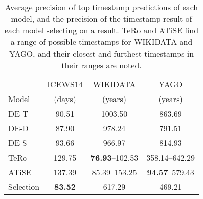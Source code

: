 \begin{table}[htb]
\centering
\begin{minipage}{0.95\columnwidth}
\centering
\caption{Average precision of top timestamp predictions of each model, and the precision of the timestamp result of each model selecting on a result. TeRo and ATiSE find a range of possible timestamps for WIKIDATA and YAGO, and their closest and furthest timestamps in their ranges are noted.}
\vspace{-3mm}

\begin{tabular}{l|ccc}\hline
 & ICEWS14 & WIKIDATA & YAGO \\
Model & (days) & (years) & (years) \\ \hline
DE-T & 90.51 & 1003.50 & 863.69 \\ 
DE-D & 87.90 & 978.24 & 791.51 \\ 
DE-S & 93.66 & 966.97 & 814.93 \\ 
TeRo & 129.75 & \textbf{76.93}–102.53 & 358.14–642.29 \\
ATiSE & 137.39 & 85.39–153.25 & \textbf{94.57}–579.43 \\ \hline
Selection & \textbf{83.52} & 617.29 & 469.21 \\ \hline 

\end{tabular}

\label{tab:timestamp_voting_table}
\end{minipage}
\end{table}

